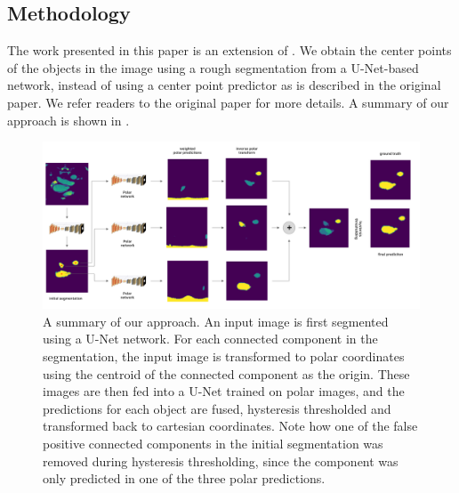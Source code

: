 \subsection{Methodology}


The work presented in this paper is an extension of \cite{bencevicTrainingPolarImage2021}. We obtain the center points of the objects in the image using a rough segmentation from a U-Net-based network, instead of using a center point predictor as is described in the original paper. We refer readers to the original paper for more details. A summary of our approach is shown in .

\begin{figure}[h]
\centering
\includegraphics[width=\textwidth]{images/4/summary}
\caption{A summary of our approach. An input image is first segmented using a U-Net network. For each connected component in the segmentation, the input image is transformed to polar coordinates using the centroid of the connected component as the origin. These images are then fed into a U-Net trained on polar images, and the predictions for each object are fused, hysteresis thresholded and transformed back to cartesian coordinates. Note how one of the false positive connected components in the initial segmentation was removed during hysteresis thresholding, since the component was only predicted in one of the three polar predictions.}
\label{fig:summary}
\end{figure}

